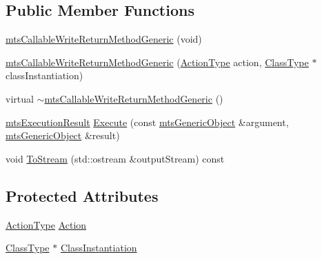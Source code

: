 \subsection*{Public Member Functions}
\begin{DoxyCompactItemize}
\item 
\hyperlink{classmts_callable_write_return_method_generic_aaa279fb8ac7b2f9d4a4ca32f926d91ec}{mts\-Callable\-Write\-Return\-Method\-Generic} (void)
\item 
\hyperlink{classmts_callable_write_return_method_generic_a10bac79c8416929f528f05846cab9e88}{mts\-Callable\-Write\-Return\-Method\-Generic} (\hyperlink{classmts_callable_write_return_method_generic_a4316e9ab3973c5b01799864a32167400}{Action\-Type} action, \hyperlink{classmts_callable_write_return_method_generic_a32ecf59575aa52541be0693586a2319d}{Class\-Type} $\ast$class\-Instantiation)
\item 
virtual \hyperlink{classmts_callable_write_return_method_generic_a5e0e72a8c660f323a3d9f7d0749f3400}{$\sim$mts\-Callable\-Write\-Return\-Method\-Generic} ()
\item 
\hyperlink{classmts_execution_result}{mts\-Execution\-Result} \hyperlink{classmts_callable_write_return_method_generic_a9ef7437ea9fe1622d42a9b5f49c428f9}{Execute} (const \hyperlink{classmts_generic_object}{mts\-Generic\-Object} \&argument, \hyperlink{classmts_generic_object}{mts\-Generic\-Object} \&result)
\item 
void \hyperlink{classmts_callable_write_return_method_generic_ae99bbbfb944bf164dfa90df630a31263}{To\-Stream} (std\-::ostream \&output\-Stream) const 
\end{DoxyCompactItemize}
\subsection*{Protected Attributes}
\begin{DoxyCompactItemize}
\item 
\hyperlink{classmts_callable_write_return_method_generic_a4316e9ab3973c5b01799864a32167400}{Action\-Type} \hyperlink{classmts_callable_write_return_method_generic_a26ed7c8f096968628c889c74c330ef56}{Action}
\item 
\hyperlink{classmts_callable_write_return_method_generic_a32ecf59575aa52541be0693586a2319d}{Class\-Type} $\ast$ \hyperlink{classmts_callable_write_return_method_generic_a8439ed2ecdee526070cb9f7d34cd100b}{Class\-Instantiation}
\end{DoxyCompactItemize}


